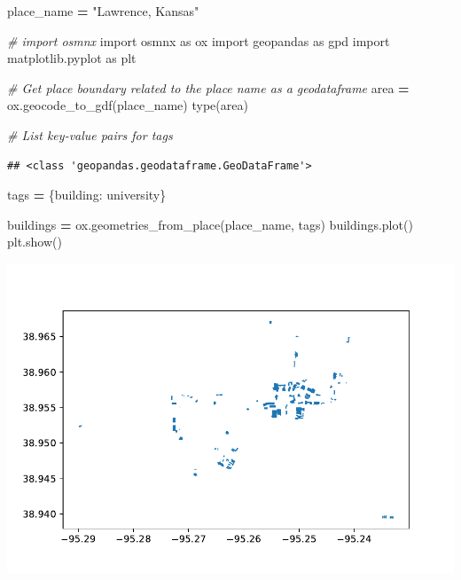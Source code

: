 \documentclass[
  paper=a4,
  ,captions=tableheading
]{scrartcl}
\newenvironment{Shaded}{\begin{snugshade}}{\end{snugshade}}
\newcommand{\BuiltInTok}[1]{#1}
\newcommand{\CommentTok}[1]{\textcolor[rgb]{0.56,0.35,0.01}{\textit{#1}}}
\newcommand{\ImportTok}[1]{#1}
\newcommand{\NormalTok}[1]{#1}
\newcommand{\OperatorTok}[1]{\textcolor[rgb]{0.81,0.36,0.00}{\textbf{#1}}}
\newcommand{\StringTok}[1]{\textcolor[rgb]{0.31,0.60,0.02}{#1}}
\begin{document}
\begin{Shaded}
\begin{Highlighting}[]
\NormalTok{place\_name }\OperatorTok{=} \StringTok{"Lawrence, Kansas"}

\CommentTok{\# import osmnx}
\ImportTok{import}\NormalTok{ osmnx }\ImportTok{as}\NormalTok{ ox}
\ImportTok{import}\NormalTok{ geopandas }\ImportTok{as}\NormalTok{ gpd}
\ImportTok{import}\NormalTok{ matplotlib.pyplot }\ImportTok{as}\NormalTok{ plt}

\CommentTok{\# Get place boundary related to the place name as a geodataframe}
\NormalTok{area }\OperatorTok{=}\NormalTok{ ox.geocode\_to\_gdf(place\_name)}
\BuiltInTok{type}\NormalTok{(area)}


\CommentTok{\# List key{-}value pairs for tags}
\end{Highlighting}
\end{Shaded}

\begin{verbatim}
## <class 'geopandas.geodataframe.GeoDataFrame'>
\end{verbatim}

\begin{Shaded}
\begin{Highlighting}[]
\NormalTok{tags }\OperatorTok{=}\NormalTok{ \{}\StringTok{\textquotesingle{}building\textquotesingle{}}\NormalTok{: }\StringTok{\textquotesingle{}university\textquotesingle{}}\NormalTok{\}   }


\NormalTok{buildings }\OperatorTok{=}\NormalTok{ ox.geometries\_from\_place(place\_name, tags)}
\NormalTok{buildings.plot()}
\NormalTok{plt.show()}
\end{Highlighting}
\end{Shaded}

\includegraphics{Haskell_files/figure-latex/unnamed-chunk-15-1.pdf}
\end{document}
